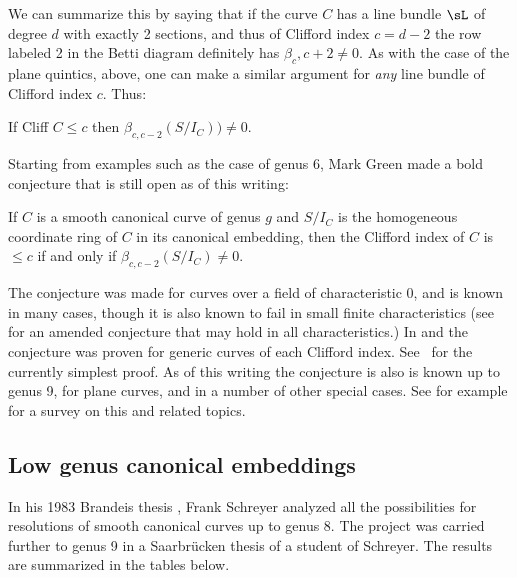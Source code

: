 We can summarize this by saying
that if the curve $C$ has a line bundle $\sL$ of degree $d$ with exactly 2 sections, and thus of Clifford index $c = d-2$ the row labeled  2 
in the Betti diagram definitely has $\beta_c, c+2\neq 0$. As with the case of the plane quintics, above, one can
make a similar argument for \emph{any} line bundle of Clifford index $c$. Thus:

\begin{corollary}
 If Cliff $C \leq c$ then $\beta_{c,c-2}(S/I_C)) \neq 0.$
\end{corollary}
 

Starting from examples such as the case of genus 6, Mark Green made a bold conjecture that is still open as of this writing:

\begin{conjecture}
If $C$ is a smooth canonical curve of genus $g$ and $S/I_C$ is the homogeneous coordinate ring of $C$ in its canonical embedding,
then the Clifford index of $C$ is $\leq c$ if and only if $\beta_{c,c-2}(S/I_C) \neq 0$. 
\end{conjecture}

The conjecture was made for curves over a field of characteristic 0, and is known in many cases, though it is also known to fail in small finite characteristics (see~\cite{Bopp-Schreyer} for an amended conjecture that may hold in all characteristics.)
In \cite{MR1941089} and \cite{MR2157134} the conjecture was proven for generic curves of each Clifford index.  See~\cite{MR4022070} for the currently simplest
proof. As of this writing the conjecture is also is known up to genus 9,  for plane curves, and in a number of other special cases.
See for example \cite{Farkas-progress-on-syzygies} for a survey on this and related topics.

\subsection{Low genus canonical embeddings} 
In his 1983 Brandeis thesis \cite{Schreyer-canonical}, Frank Schreyer analyzed all the possibilities for resolutions of smooth canonical curves up to genus 8. The project was carried further to genus 9 in a Saarbr\"ucken thesis \cite{Sagraloff}  of a student of Schreyer. The results are summarized in the tables below.

